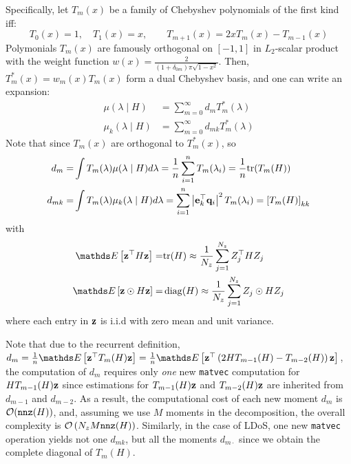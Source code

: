 \documentclass{mynotes}
\begin{document}
Specifically, let \( T_m(x) \) be a family of Chebyshev polynomials of the first kind iff:
\begin{equation}
      T_0(x) = 1, \quad T_1(x) = x, \qquad T_{m+1}(x) = 2x T_m(x) - T_{m-1}(x) 
\end{equation}
Polymonials \( T_m(x) \) are famously orthogonal on \( [-1, 1] \) in \(L_2\)-scalar product with the weight function \( w(x) = \frac{2}{(1+\delta_{0m})\pi \sqrt{1-x^2}}\). Then, \( T^*_m(x) = w_m(x) T_m(x)\) form a dual Chebyshev basis, and one can write an expansion:
\begin{equation}
      \begin{aligned}
            \mu( \lambda \mid H ) & = \sum_{m=0}^{\infty} d_m T^*_m(\lambda)     \\
            \mu_k( \lambda \mid H ) & = \sum_{m=0}^{\infty} d_{mk} T^*_m(\lambda)   
      \end{aligned}
\end{equation}
Note that since \( T_m(x) \) are orthogonal to \( T^*_m(x) \), so 
\begin{equation}
      \begin{aligned}
            d_m = & \int T_m(\lambda) \mu(\lambda \mid H) d\lambda = \frac{1}{n} \sum_{i=1}^n T_m(\lambda_i) = \frac{1}{n} \mathrm{tr} (T_m(H)) \\
            d_{mk} = & \int T_m(\lambda) \mu_k(\lambda \mid H) d\lambda = \sum_{i=1}^n \left| \mathbf{e}_k^\top \mathbf{q}_i \right|^2 T_m(\lambda_i) = \left[ T_m( H ) \right]_{kk}
      \end{aligned}
\end{equation}
with 
\begin{equation}
      \begin{aligned}
            \ds E \left[ \b z^\top H \b z \right] = & \mathrm{tr}(H) \approx \frac{1}{N_z} \sum_{j=1}^{N_z} Z_j^\top H Z_j \\
            \ds E \left[ \b z \odot H \b z \right] = & \diag ( H ) \approx \frac{1}{N_z} \sum_{j=1}^{N_z} Z_j \odot H Z_j  
      \end{aligned}
\end{equation}
where each entry in \( \mathbf{z} \) is i.i.d with zero mean and unit variance. 

Note that due to the recurrent definition, \( d_m = \frac{1}{n} \ds E \left[ \b z^\top T_m(H) \b z \right] = \frac{1}{n} \ds E \left[ \b z^\top \left( 2 H T_{m-1}(H) - T_{m-2}(H) \right) \b z \right] \), the computation of \( d_m \) requires only \emph{one} new \texttt{matvec} computation for \( H T_{m-1}(H) \mathbf{z} \) since estimations for \( T_{m-1}(H) \mathbf{z} \) and \( T_{m-2}(H) \mathbf{z} \) are inherited from \( d_{m-1} \) and \( d_{m-2}\). As a result, the computational cost of each new moment \( d_m \) is \( \mathcal{O}( \texttt{nnz}(H))\), and, assuming we use \( M \) moments in the decomposition, the overall complexity is \( \mathcal{O} \left( N_z M \texttt{nnz}(H)  \right)\). Similarly, in the case of LDoS, one new \texttt{matvec} operation yields not one \( d_{mk}\), but all the moments \( d_{m\cdot}\) since we obtain the complete diagonal of \( T_m(H) \).
\end{document}
